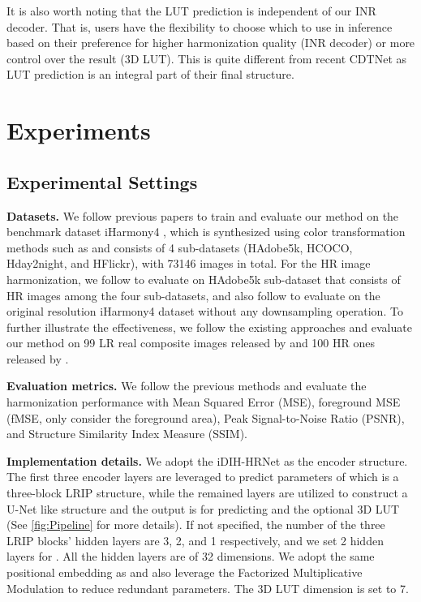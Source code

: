 \documentclass[10pt,journal,twocolumn,twoside]{IEEEtran}
\begin{document}
It is also worth noting that the LUT prediction is independent of our INR decoder. That is, users have the flexibility to choose which to use in inference based on their preference for higher harmonization quality (INR decoder) or more control over the result (3D LUT). This is quite different from recent CDTNet \cite{cong2022high} as LUT prediction is an integral part of their final structure.



\section{Experiments}
\label{sec:exp}

\subsection{Experimental Settings}
\label{subsec:exp settings}

\textbf{Datasets.} We follow previous papers to train and evaluate our method on the benchmark dataset iHarmony4 \cite{cong2020dovenet}, which is synthesized using color transformation methods such as \cite{fecker2008histogram} and consists of 4 sub-datasets (HAdobe5k, HCOCO, Hday2night, and HFlickr), with 73146 images in total. For the HR image harmonization, we follow \cite{cong2022high} to evaluate on HAdobe5k sub-dataset that consists of HR images among the four sub-datasets, and also follow \cite{ke2022harmonizer, xue2022dccf} to evaluate on the original resolution iHarmony4 dataset without any downsampling operation. To further illustrate the effectiveness, we follow the existing approaches \cite{hang2022scs, ling2021region, guo2021image, cong2022high} and evaluate our method on 99 LR real composite images released by \cite{tsai2017deep} and 100 HR ones released by \cite{cong2022high}.

\textbf{Evaluation metrics.} We follow the previous methods and evaluate the harmonization performance with Mean Squared Error (MSE), foreground MSE (fMSE, only consider the foreground area), Peak Signal-to-Noise Ratio (PSNR), and Structure Similarity Index Measure (SSIM).

\textbf{Implementation details.}
We adopt the iDIH-HRNet \cite{sofiiuk2021foreground} as the encoder structure. The first three encoder layers are leveraged to predict parameters of  which is a three-block LRIP structure, while the remained layers are utilized to construct a U-Net\cite{ronneberger2015u} like structure and the output is for predicting  and the optional 3D LUT (See \cref{fig:Pipeline} for more details). If not specified, the number of the three LRIP blocks' hidden layers are 3, 2, and 1 respectively, and we set 2 hidden layers for . All the hidden layers are of 32 dimensions. We adopt the same positional embedding as \cite{anokhin2021image} and also leverage the Factorized Multiplicative Modulation\cite{skorokhodov2021adversarial} to reduce redundant parameters. The 3D LUT dimension is set to 7.
\end{document}
